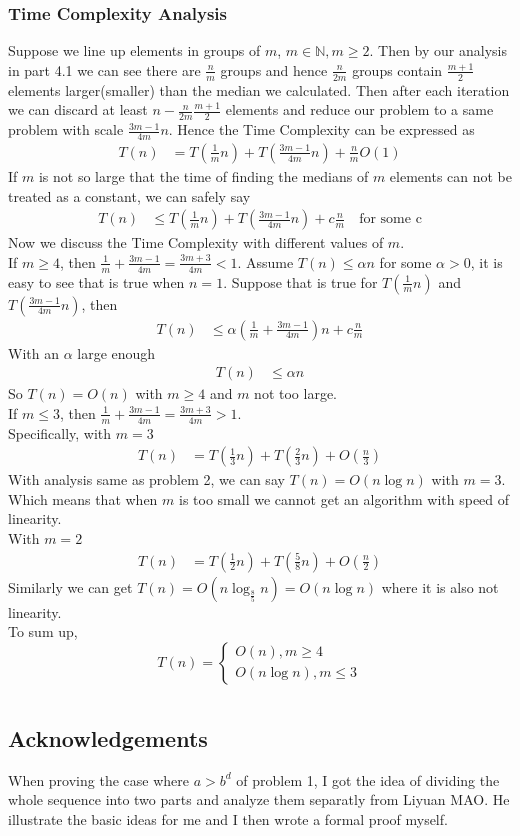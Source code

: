 \documentclass[12pt,letterpaper]{article}
\begin{document}
\subsubsection{Time Complexity Analysis}
Suppose we line up elements in groups of $m$, $m\in\mathbb{N},m\geq 2$. Then by our analysis in part 4.1 we can see there are $\frac{n}{m}$ groups and hence $\frac{n}{2m}$ groups contain $\frac{m+1}{2}$ elements larger(smaller) than the median we calculated. Then after each iteration we can discard at least $n-\frac{n}{2m}\frac{m+1}{2}$ elements and reduce our problem to a same problem with scale $\frac{3m-1}{4m}n$. Hence the Time Complexity can be expressed as 
\begin{align}
    T(n)&=T(\frac{1}{m}n)+T(\frac{3m-1}{4m}n)+\frac{n}{m}O(1)
\end{align}
If $m$ is not so large that the time of finding the medians of $m$ elements can not be treated as a constant, we can safely say 
\begin{align}
    T(n)&\leq T(\frac{1}{m}n)+T(\frac{3m-1}{4m}n)+c\frac{n}{m} \quad \text{for some c}
\end{align}
Now we discuss the Time Complexity with different values of $m$.\\
If $m\geq 4$, then $\frac{1}{m}+\frac{3m-1}{4m}=\frac{3m+3}{4m}<1$. Assume $T(n)\leq\alpha n$ for some $\alpha>0$, it is easy to see that is true when $n=1$. Suppose that is true for $T(\frac{1}{m}n)$ and $T(\frac{3m-1}{4m}n)$, then 
\begin{align}
    T(n)&\leq \alpha\left(\frac{1}{m}+\frac{3m-1}{4m}\right)n+c\frac{n}{m}
\end{align} 
With an $\alpha$ large enough
\begin{align}
    T(n)&\leq \alpha n
\end{align}
So $T(n)=O(n)$ with $m\geq 4$ and $m$ not too large. \\
If $m\leq 3$, then $\frac{1}{m}+\frac{3m-1}{4m}=\frac{3m+3}{4m}>1$. \\
Specifically, with $m=3$
\begin{align}
    T(n)&=T(\frac{1}{3}n)+T(\frac{2}{3}n)+O(\frac{n}{3})
\end{align}
With analysis same as problem 2, we can say $T(n)=O(n\log n)$ with $m=3$. Which means that when $m$ is too small we cannot get an algorithm with speed of linearity.\\
With $m=2$
\begin{align}
    T(n)&=T(\frac{1}{2}n)+T(\frac{5}{8}n)+O(\frac{n}{2})
\end{align}
Similarly we can get $T(n)=O(n\log_{\frac{8}{5}}n)=O(n\log n)$ where it is also not linearity.\\
To sum up, 
$$T(n)=\begin{cases}
    O(n), m\geq 4\\
    O(n\log n), m\leq 3
\end{cases}$$
\section{}
\subsection*{Acknowledgements}
When proving the case where $a>b^d$ of problem 1, I got the idea of dividing the whole sequence into two parts and analyze them separatly from Liyuan MAO. He illustrate the basic ideas for me and I then wrote a formal proof myself.
\end{document}
